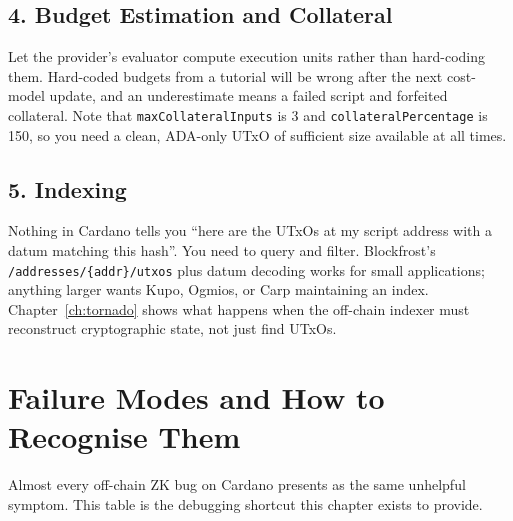 \subsection*{4. Budget Estimation and Collateral}

Let the provider's evaluator compute execution units rather than hard-coding
them. Hard-coded budgets from a tutorial will be wrong after the next cost-model
update, and an underestimate means a failed script and forfeited collateral.
Note that \texttt{maxCollateralInputs} is 3 and
\texttt{collateralPercentage} is 150, so you need a clean, ADA-only UTxO of
sufficient size available at all times.

\subsection*{5. Indexing}

Nothing in Cardano tells you ``here are the UTxOs at my script address with a
datum matching this hash''. You need to query and filter. Blockfrost's
\texttt{/addresses/\{addr\}/utxos} plus datum decoding works for small
applications; anything larger wants Kupo, Ogmios, or Carp maintaining an index.
Chapter~\ref{ch:tornado} shows what happens when the off-chain indexer must
reconstruct cryptographic state, not just find UTxOs.

\section{Failure Modes and How to Recognise Them} \label{sec:ch7-failures}

Almost every off-chain ZK bug on Cardano presents as the same unhelpful
symptom. This table is the debugging shortcut this chapter exists to provide.

